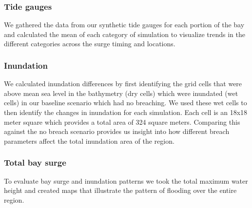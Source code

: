 \documentclass{coastal_paper}
\begin{document}
\subsubsection{Tide gauges}
We gathered the data from our synthetic tide gauges for each portion of the bay and calculated the mean of each category of simulation to visualize trends in the different categories across the surge timing and locations.
\subsubsection{Inundation}
We calculated inundation differences by first identifying the grid cells that were above mean sea level in the bathymetry (dry cells) which were inundated  (wet cells) in our baseline scenario which had no breaching. We used these wet cells to then identify the changes in inundation for each simulation. Each cell is an 18x18 meter square which provides a total area of 324 square meters. Comparing this against the no breach scenario provides us insight into how different breach parameters affect the total inundation area of the region. 
\subsubsection{Total bay surge}
To evaluate bay surge and inundation patterns we took the total maximum water height and created maps that illustrate the pattern of flooding over the entire region.
\end{document}
